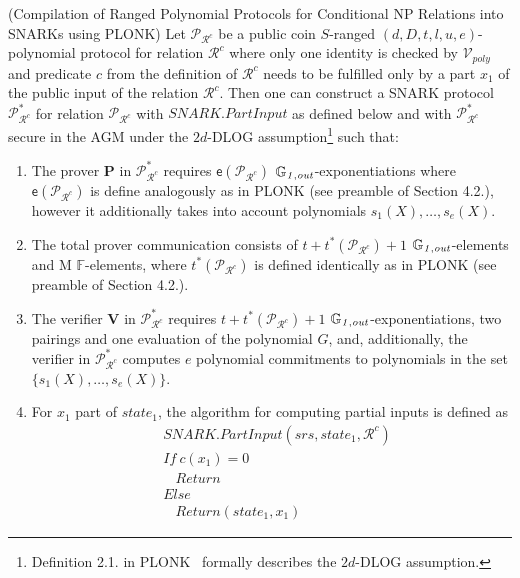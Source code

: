 \begin{lemma}(Compilation of Ranged Polynomial Protocols for Conditional NP Relations into SNARKs using PLONK) 
\label{le:compilation_step_1}
Let $\mathscr{P}_{\mathcal{R}^c}$ be a public coin $S$-ranged $(d, D, t, l, u, e)$-polynomial protocol for relation $\mathcal{R}^c$ where only 
one identity is checked by $\mathcal{V}_{poly}$ and predicate $c$ from the definition of ${\mathcal{R}^c}$ needs to be fulfilled only by a part $x_1$ 
of the public input of the relation ${\mathcal{R}^c}$. Then one can construct a SNARK protocol $\mathscr{P}^*_{\mathcal{R}^c}$ for relation 
$\mathscr{P}_{\mathcal{R}^c}$ with $\mathit{SNARK.PartInput}$ as defined below 
and with $\mathscr{P}^*_{\mathcal{R}^c}$ secure in the AGM under the $2d$-DLOG 
assumption\footnote{Definition 2.1. in PLONK~\cite{plonk} formally describes the $2d$-DLOG assumption.} such that:
\begin{enumerate}
\item The prover $\mathbf{P}$ in $\mathscr{P}^*_{\mathcal{R}^c}$ requires $\mathsf{e}(\mathscr{P}_{\mathcal{R}^c})$ $\mathbb{G}_{\mathit{1,out}}$-exponentiations where 
$\mathsf{e}(\mathscr{P}_{\mathcal{R}^c})$ is define analogously as in PLONK (see preamble of Section 4.2.), however it additionally takes into account 
polynomials $s_1(X), \ldots, s_e(X)$. 
\item The total prover communication consists of $t + t^*(\mathscr{P}_{\mathcal{R}^c}) + 1$ $\mathbb{G}_{\mathit{1,out}}$-elements and M $\mathbb{F}$-elements, where 
$t^*(\mathscr{P}_{\mathcal{R}^c})$ is defined identically as in PLONK (see preamble of Section 4.2.).
\item The verifier $\mathbf{V}$ in $\mathscr{P}^*_{\mathcal{R}^c}$ requires $t + t^*(\mathscr{P}_{\mathcal{R}^c})+1$ $\mathbb{G}_{\mathit{1,out}}$-exponentiations, 
two pairings and one evaluation of the polynomial $G$, and, additionally, the verifier in $\mathscr{P}^*_{\mathcal{R}^c}$ computes $e$ 
polynomial commitments to polynomials in the set $\{s_1(X), \ldots, s_e(X)\}$. 
\item For $x_1$ part of  $\mathit{state_1}$, the algorithm for computing partial inputs is defined as 
\begin{align*}
&\mathit{SNARK.PartInput}(\mathit{srs}, \mathit{state_1}, \mathcal{R}^c) \\
&\mathit{If \ } c(x_1) = 0 \\
&\ \ \ \ \mathit{Return} \\
&\mathit{Else } \\
&\ \ \ \ \mathit{Return} (\mathit{state_1}, x_1)
\end{align*}
\end{enumerate}
\end{lemma}